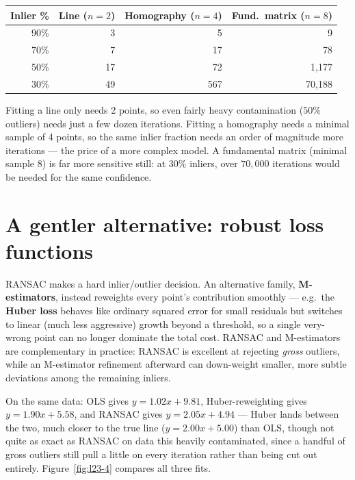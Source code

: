 \begin{center}
\renewcommand{\arraystretch}{1.3}
\begin{tabular}{rrrr}
\hline
\textbf{Inlier \%} & \textbf{Line ($n{=}2$)} & \textbf{Homography ($n{=}4$)} & \textbf{Fund.\ matrix ($n{=}8$)} \\
\hline
90\% & 3  & 5   & 9 \\
70\% & 7  & 17  & 78 \\
50\% & 17 & 72  & 1{,}177 \\
30\% & 49 & 567 & 70{,}188 \\
\hline
\end{tabular}
\end{center}

Fitting a line only needs 2 points, so even fairly heavy contamination ($50\%$ outliers) needs just a few dozen iterations. Fitting a homography needs a minimal sample of 4 points, so the same inlier fraction needs an order of magnitude more iterations --- the price of a more complex model. A fundamental matrix (minimal sample 8) is far more sensitive still: at $30\%$ inliers, over $70{,}000$ iterations would be needed for the same confidence.

\section{A gentler alternative: robust loss functions}

RANSAC makes a hard inlier/outlier decision. An alternative family, \textbf{M-estimators}, instead reweights every point's contribution smoothly --- e.g.\ the \textbf{Huber loss} behaves like ordinary squared error for small residuals but switches to linear (much less aggressive) growth beyond a threshold, so a single very-wrong point can no longer dominate the total cost. RANSAC and M-estimators are complementary in practice: RANSAC is excellent at rejecting \emph{gross} outliers, while an M-estimator refinement afterward can down-weight smaller, more subtle deviations among the remaining inliers.

On the same data: OLS gives $y=1.02x+9.81$, Huber-reweighting gives $y=1.90x+5.58$, and RANSAC gives $y=2.05x+4.94$ --- Huber lands between the two, much closer to the true line ($y=2.00x+5.00$) than OLS, though not quite as exact as RANSAC on data this heavily contaminated, since a handful of gross outliers still pull a little on every iteration rather than being cut out entirely. Figure~\ref{fig:l23-4} compares all three fits.

